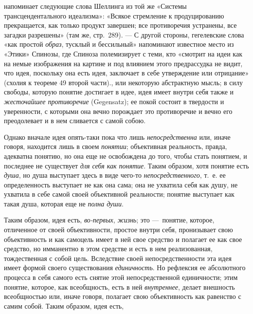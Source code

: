 \documentclass[twoside]{article}
\begin{document}
{{{{напоминает следующие слова Шеллинга из той же «Системы трансцендентального
идеализма»: «Всякое стремление к продуцированию прекращается, как только
продукт завершен; все противоречия устранены, все загадки разрешены» (там
же, стр.~289). — С другой стороны, гегелевские слова «как простой {\em образ},
тусклый и бессильный» напоминают известное место из «Этики»
Спинозы, где Спиноза полемизирует с теми, кто «смотрит на идеи как на немые
изображения на картине и под влиянием этого предрассудка не видит, что
идея, поскольку она есть идея, заключает в себе утверждение или отрицание»
(схолия к теореме 49 второй части).}\label{bkm:bm91},
или некоторую абстрактную мысль; в силу свободы, которую
понятие достигает в идее, идея имеет внутри себя также и
{\em жесточайшее противоречие}
(Gegensatz); ее покой состоит в твердости и уверенности, с
которыми она вечно порождает это противоречие и вечно его преодолевает и в
нем сливается с самой собою.

Однако вначале идея опять-таки пока что лишь
{\em непосредственна}
или, иначе говоря, находится лишь в своем
{\em понятии};
объективная реальность, правда, адекватна понятию, но она еще
не освобождена до того, чтобы стать понятием, и последнее не существует
{\em для себя как понятие}.
Таким образом, хотя понятие есть
{\em душа}, но душа
выступает здесь в виде чего-то
{\em непосредственного},
т.~е. ее определенность выступает не как она сама; она не
ухватила себя как душу, не ухватила в себе самой своей объективной
реальности; понятие выступает как такая душа, которая еще не
{\em полна души}.

Таким образом, идея есть,
{\em во-первых},
{\em жизнь}; это
—~понятие, которое, отличенное от своей объективности,
простое внутри себя, пронизывает свою объективность и как самоцель имеет в
ней свое средство и полагает ее как свое средство, но имманентно в этом
средстве и есть в нем реализованная, тождественная с собой цель. Вследствие
своей непосредственности эта идея имеет формой своего существования
{\em единичность}. Но
рефлексия ее абсолютного процесса в себя самого есть снятие этой
непосредственной единичности; этим понятие, которое, как всеобщность, есть
в ней {\em внутреннее},
делает внешность всеобщностью или, иначе говоря, полагает
свою объективность как равенство с самим собой. Таким образом, идея есть,

}}}
\end{document}
